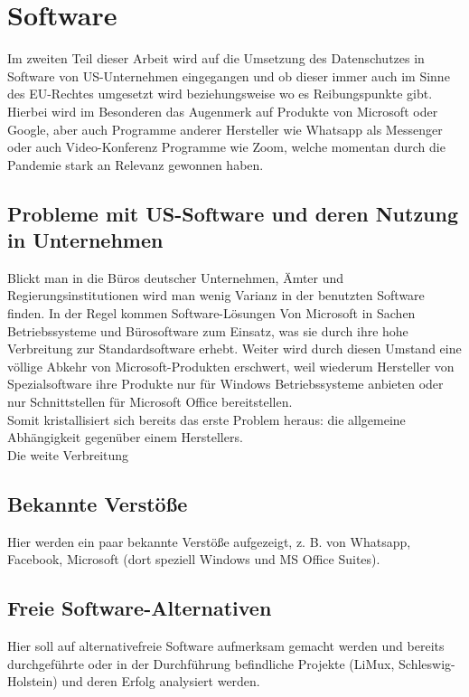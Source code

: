 \section{Software}
Im zweiten Teil dieser Arbeit wird auf die Umsetzung des Datenschutzes in Software von US-Unternehmen eingegangen und ob dieser immer auch im Sinne des EU-Rechtes umgesetzt wird beziehungsweise wo es Reibungspunkte gibt. Hierbei wird im Besonderen das Augenmerk auf Produkte von Microsoft oder Google, aber auch Programme anderer Hersteller wie Whatsapp als Messenger oder auch Video-Konferenz Programme wie Zoom, welche momentan durch die Pandemie stark an Relevanz gewonnen haben.

\subsection{Probleme mit US-Software und deren Nutzung in Unternehmen}
Blickt man in die Büros deutscher Unternehmen, Ämter und Regierungsinstitutionen wird man wenig Varianz in der benutzten Software finden. In der Regel kommen Software-Lösungen Von Microsoft in Sachen Betriebssysteme und Bürosoftware zum Einsatz, was sie durch ihre hohe Verbreitung zur Standardsoftware erhebt. Weiter wird durch diesen Umstand eine völlige Abkehr von Microsoft-Produkten erschwert, weil wiederum Hersteller von Spezialsoftware ihre Produkte nur für Windows Betriebssysteme anbieten oder nur Schnittstellen für Microsoft Office bereitstellen.\\
Somit kristallisiert sich bereits das erste Problem heraus: die allgemeine Abhängigkeit gegenüber einem Herstellers. \\
Die weite Verbreitung 

\subsection{Bekannte Verstöße}
Hier werden ein paar bekannte Verstöße aufgezeigt, z. B. von Whatsapp, Facebook, Microsoft (dort speziell Windows und MS Office Suites).

\subsection{Freie Software-Alternativen}
Hier soll auf alternativefreie Software aufmerksam gemacht werden und bereits durchgeführte oder in der Durchführung befindliche Projekte (LiMux, Schleswig-Holstein) und deren Erfolg analysiert werden.